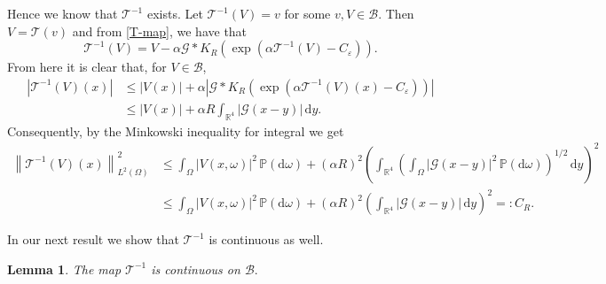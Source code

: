 \documentclass{article}
\newcommand{\backassign}{=:}
\newcommand{\mathd}{\mathrm{d}}
\newtheorem{lemma}{Lemma}
\begin{document}
Hence we know that $\mathcal{T}^{- 1}$ exists. Let ${\mathcal{T}^{- 1}}  (V) =
v$ for some $v, V \in \mathcal{B}$. Then $V =\mathcal{T} (v)$ and from \eqref{T-map}, we have that
%
\begin{equation}
    {\mathcal{T}^{- 1}}  (V) = V - \alpha \mathcal{G} \ast K_R \left( \exp
    \left( {\alpha \mathcal{T}^{- 1}}  (V) - C_{\varepsilon} \right) \right) .
  \label{T-inv-map}
\end{equation}
%
From here it is clear that, for $V \in \mathcal{B}$, \begin{align}
    \left| {\mathcal{T}^{- 1}}  (V) (x) \right| & \leqslant  | V (x) | +
     \alpha \left| \mathcal{G} \ast K_R \left( \exp \left( {\alpha
     \mathcal{T}^{- 1}}  (V) (x) - C_{\varepsilon} \right) \right) \right|\\
     & \leqslant  | V (x) | + \alpha R \int_{\mathbb{R}^4} | \mathcal{G} (x
     - y) | \, \mathd y.   
\end{align}
%
Consequently, by the Minkowski inequality for integral we get
%
\begin{align}
    \left\| {\mathcal{T}^{- 1}}  (V) (x) \right\|_{L^2 (\Omega)}^2 & \leq
     \int_{\Omega} | V (x, \omega) |^2 \, \mathbb{P} (\mathd \omega) + (\alpha R)^2
    \left( \int_{\mathbb{R}^4} \left( \int_{\Omega} | \mathcal{G} (x - y) |^2 \, 
    \mathbb{P} (\mathd \omega) \right)^{1 / 2} \, \mathd y \right)^2\\
    & \leq \int_{\Omega} | V (x, \omega) |^2 \, \mathbb{P} (\mathd \omega) +
    (\alpha R)^2 \left( \int_{\mathbb{R}^4} | \mathcal{G} (x - y) | \, \mathd y
    \right)^2 \backassign  C_R .
  \label{est-invT}
\end{align}



In our next result we show that $\mathcal{T}^{- 1}$ is continuous as well.
%
\begin{lemma}
  \label{lem-T-inv-continuity}The map $\mathcal{T}^{- 1}$ is continuous on
  $\mathcal{B}.$
\end{lemma}
\end{document}
